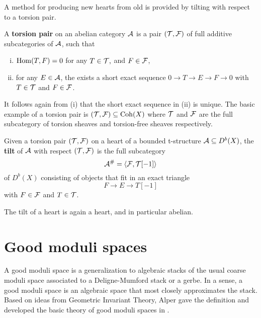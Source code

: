 A method for producing new hearts from old is provided by tilting with respect to a torsion pair.
\begin{defn}
    A {\bf torsion pair} on an abelian category $\mathcal{A}$ is a pair $(\mathcal{T}, \mathcal{F})$ of full additive subcategories of $\mathcal{A}$, such that
    \begin{enumerate}[(i)]
        \item $\mathrm{Hom}(T, F) = 0$ for any $T \in \mathcal{T},$ and $F \in \mathcal{F}$,
        \item for any $E \in \mathcal{A}$, the exists a short exact sequence $0 \to T \to E \to F \to 0$ with $T \in \mathcal{T}$ and $F \in \mathcal{F}$.
    \end{enumerate}
\end{defn}
It follows again from (i) that the short exact sequence in (ii) is unique. The basic example of a torsion pair is $(\mathcal{T}, \mathcal{F}) \subseteq \operatorname{\mathrm{Coh}}(X)$ where $\mathcal{T}$ and $\mathcal{F}$ are the full subcategory of torsion sheaves and torsion-free sheaves respectively.
\begin{defn}
    Given a torsion pair $(\mathcal{T}, \mathcal{F})$ on a heart of a bounded t-structure $\mathcal{A} \subseteq D^b(X)$, the {\bf tilt} of $\mathcal{A}$ with respect $(\mathcal{T}, \mathcal{F})$ is the full subcategory
    \[ \mathcal{A}^\# = \langle \mathcal{F}, \mathcal{T}[-1] \rangle \]
    of $D^b(X)$ consisting of objects that fit in an exact triangle
    \[ F \to E \to T[-1] \]
    with $F \in \mathcal{F}$ and $T \in \mathcal{T}$.
\end{defn}
The tilt of a heart is again a heart, and in particular abelian.

\section{Good moduli spaces}
A good moduli space is a generalization to algebraic stacks of the usual coarse moduli space associated to a Deligne-Mumford stack or a gerbe. In a sense, a good moduli space is an algebraic space that most closely approximates the stack. Based on ideas from Geometric Invariant Theory, Alper gave the definition and developed the basic theory of good moduli spaces in \cite{AlperGMS}.

